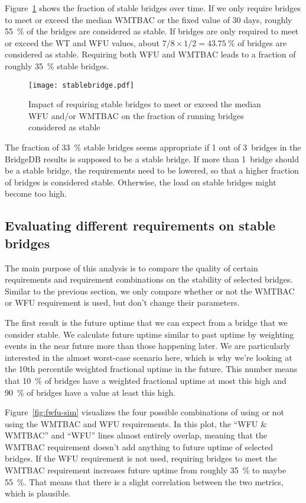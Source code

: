 \documentclass{article}
\begin{document}
Figure~\ref{fig:stablebridge} shows the fraction of stable bridges over
time.
If we only require bridges to meet or exceed the median WMTBAC or the
fixed value of 30 days, roughly 55~\% of the bridges are considered as
stable.
If bridges are only required to meet or exceed the WT and WFU values,
about $7/8 \times 1/2 = 43.75~\%$ of bridges are considered as stable.
Requiring both WFU and WMTBAC leads to a fraction of roughly 35~\% stable
bridges.

\begin{figure}[t]
\texttt{[image: stablebridge.pdf]}
\caption{Impact of requiring stable bridges to meet or exceed the median
WFU and/or WMTBAC on the fraction of running bridges considered as stable}
\label{fig:stablebridge}
\end{figure}

The fraction of 33~\% stable bridges seems appropriate if 1 out of
3~bridges in the BridgeDB results is supposed to be a stable bridge.
If more than 1~bridge should be a stable bridge, the requirements need to
be lowered, so that a higher fraction of bridges is considered stable.
Otherwise, the load on stable bridges might become too high.

\subsection{Evaluating different requirements on stable bridges}
\label{sec:selectedstability}

The main purpose of this analysis is to compare the quality of certain
requirements and requirement combinations on the stability of selected
bridges.
Similar to the previous section, we only compare whether or not the WMTBAC
or WFU requirement is used, but don't change their parameters.

The first result is the future uptime that we can expect from a bridge
that we consider stable.
We calculate future uptime similar to past uptime by weighting events in
the near future more than those happening later.
We are particularly interested in the almost worst-case scenario here,
which is why we're looking at the 10th percentile weighted fractional
uptime in the future.
This number means that 10~\% of bridges have a weighted fractional uptime
at most this high and 90~\% of bridges have a value at least this high.

Figure~\ref{fig:fwfu-sim} visualizes the four possible combinations of
using or not using the WMTBAC and WFU requirements.
In this plot, the ``WFU \& WMTBAC'' and ``WFU'' lines almost entirely
overlap, meaning that the WMTBAC requirement doesn't add anything to
future uptime of selected bridges.
If the WFU requirement is not used, requiring bridges to meet the WMTBAC
requirement increases future uptime from roughly 35~\% to maybe 55~\%.
That means that there is a slight correlation between the two metrics,
which is plausible.
\end{document}

